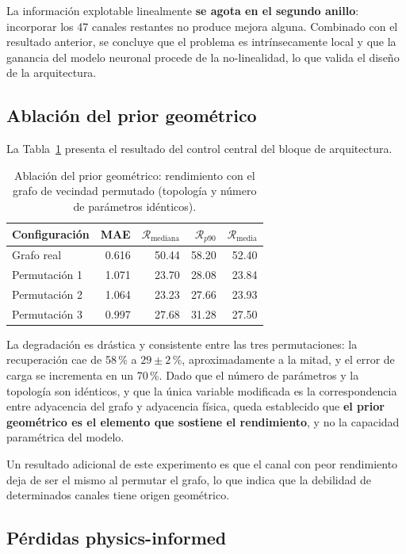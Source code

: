La información explotable linealmente \textbf{se agota en el segundo anillo}: incorporar los 47
canales restantes no produce mejora alguna. Combinado con el resultado anterior, se concluye que el
problema es intrínsecamente local y que la ganancia del modelo neuronal procede de la no-linealidad,
lo que valida el diseño de la arquitectura.

\subsection{Ablación del prior geométrico}
\label{subsec:res-ablacion}

La Tabla~\ref{tab:res-ablacion} presenta el resultado del control central del bloque de
arquitectura.

\begin{table}[htbp]
\centering
\caption{Ablación del prior geométrico: rendimiento con el grafo de vecindad permutado
(topología y número de parámetros idénticos).}
\label{tab:res-ablacion}
\begin{tabular}{lrrrr}
\toprule
\textbf{Configuración} & \textbf{MAE} & $\mathcal{R}_{\text{mediana}}$ & $\mathcal{R}_{p90}$ & $\mathcal{R}_{\text{media}}$ \\
\midrule
Grafo real & 0.616 & 50.44 & 58.20 & 52.40 \\
Permutación 1 & 1.071 & 23.70 & 28.08 & 23.84 \\
Permutación 2 & 1.064 & 23.23 & 27.66 & 23.93 \\
Permutación 3 & 0.997 & 27.68 & 31.28 & 27.50 \\
\bottomrule
\end{tabular}
\end{table}

La degradación es drástica y consistente entre las tres permutaciones: la recuperación cae de
58\,\% a $29 \pm 2$\,\%, aproximadamente a la mitad, y el error de carga se incrementa en un 70\,\%.
Dado que el número de parámetros y la topología son idénticos, y que la única variable modificada es
la correspondencia entre adyacencia del grafo y adyacencia física, queda establecido que
\textbf{el prior geométrico es el elemento que sostiene el rendimiento}, y no la capacidad
paramétrica del modelo.

Un resultado adicional de este experimento es que el canal con peor rendimiento deja de ser el mismo
al permutar el grafo, lo que indica que la debilidad de determinados canales tiene origen geométrico.

\subsection{Pérdidas physics-informed}
\label{subsec:res-loss}

